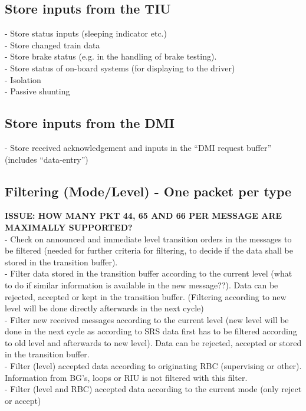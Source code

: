 \documentclass{template/openetcs_report}
\begin{document}
\subsection{Store inputs from the TIU}
- Store status inputs (sleeping indicator etc.)\\
- Store changed train data\\
- Store brake status (e.g. in the handling of brake testing).\\
- Store status of on-board systems (for displaying to the driver)\\
- Isolation\\
- Passive shunting\\

\subsection{Store inputs from the \gls{DMI}}
- Store received acknowledgement and inputs in the “\gls{DMI} request buffer” (includes “data-entry”)\\

\subsection{Filtering (Mode/Level) - One packet per type}
\textbf{ISSUE: HOW MANY PKT 44, 65 AND 66 PER MESSAGE ARE MAXIMALLY SUPPORTED?}\\
- Check on announced and immediate level transition orders in the messages to be filtered (needed for further criteria for filtering, to decide if the data shall be stored in the transition buffer).\\
- Filter data stored in the transition buffer according to the current level (what to do if similar information is available in the new message??). Data can be rejected, accepted or kept in the transition buffer.
(Filtering according to new level will be done directly afterwards in the next cycle)\\
- Filter new received messages according to the current level (new level will be done in the next cycle as according to \gls{SRS} data first has to be filtered according to old level and afterwards to new level). Data can be rejected, accepted or stored in the transition buffer.\\
- Filter (level) accepted data according to originating RBC (supervising or other). Information from \gls{BG}'s, loops or RIU is not filtered with this filter.\\
- Filter (level and RBC) accepted data according to the current mode (only reject or accept)\\
\end{document}
